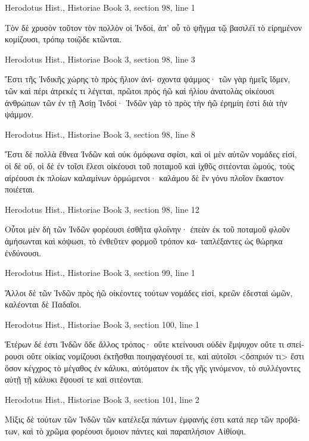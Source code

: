 \documentclass[12pt,letterpaper,twoside,final]{memoir}
\begin{document}
\begin{greek}
Herodotus Hist., Historiae 
Book 3, section 98, line 1

Τὸν δὲ χρυσὸν τοῦτον τὸν πολλὸν οἱ Ἰνδοί, ἀπ' οὗ τὸ 
ψῆγμα τῷ βασιλέϊ τὸ εἰρημένον κομίζουσι, τρόπῳ τοιῷδε 
κτῶνται. 



Herodotus Hist., Historiae 
Book 3, section 98, line 3

          Ἔστι τῆς Ἰνδικῆς χώρης τὸ πρὸς ἥλιον ἀνί-
σχοντα ψάμμος· τῶν γὰρ ἡμεῖς ἴδμεν, τῶν καὶ πέρι ἀτρεκές 
τι λέγεται, πρῶτοι πρὸς ἠῶ καὶ ἡλίου ἀνατολὰς οἰκέουσι 
ἀνθρώπων τῶν ἐν τῇ Ἀσίῃ Ἰνδοί· Ἰνδῶν γὰρ τὸ πρὸς τὴν 
ἠῶ ἐρημίη ἐστὶ διὰ τὴν ψάμμον. 



Herodotus Hist., Historiae 
Book 3, section 98, line 8

Ἔστι δὲ πολλὰ ἔθνεα Ἰνδῶν καὶ οὐκ ὁμόφωνα σφίσι, καὶ 
οἱ μὲν αὐτῶν νομάδες εἰσί, οἱ δὲ οὔ, οἱ δὲ ἐν τοῖσι ἕλεσι 
οἰκέουσι τοῦ ποταμοῦ καὶ ἰχθῦς σιτέονται ὠμούς, τοὺς 
αἱρέουσι ἐκ πλοίων καλαμίνων ὁρμώμενοι· καλάμου δὲ ἓν 
γόνυ πλοῖον ἕκαστον ποιέεται. 



Herodotus Hist., Historiae 
Book 3, section 98, line 12

                                   Οὗτοι μὲν δὴ τῶν Ἰνδῶν 
φορέουσι ἐσθῆτα φλοΐνην· ἐπεὰν ἐκ τοῦ ποταμοῦ φλοῦν   
ἀμήσωνται καὶ κόψωσι, τὸ ἐνθεῦτεν φορμοῦ τρόπον κα-
ταπλέξαντες ὡς θώρηκα ἐνδύνουσι. 



Herodotus Hist., Historiae 
Book 3, section 99, line 1

                                      Ἄλλοι δὲ τῶν Ἰνδῶν 
πρὸς ἠῶ οἰκέοντες τούτων νομάδες εἰσί, κρεῶν ἐδεσταὶ 
ὠμῶν, καλέονται δὲ Παδαῖοι. 



Herodotus Hist., Historiae 
Book 3, section 100, line 1

                                     Ἑτέρων δέ ἐστι Ἰνδῶν 
ὅδε ἄλλος τρόπος· οὔτε κτείνουσι οὐδὲν ἔμψυχον οὔτε τι 
σπείρουσι οὔτε οἰκίας νομίζουσι ἐκτῆσθαι ποιηφαγέουσί τε, 
καὶ αὐτοῖσι <ὄσπριόν τι> ἔστι ὅσον κέγχρος τὸ μέγαθος ἐν 
κάλυκι, αὐτόματον ἐκ τῆς γῆς γινόμενον, τὸ συλλέγοντες 
αὐτῇ τῇ κάλυκι ἕψουσί τε καὶ σιτέονται. 



Herodotus Hist., Historiae 
Book 3, section 101, line 2

                                                     Μίξις δὲ 
τούτων τῶν Ἰνδῶν τῶν κατέλεξα πάντων ἐμφανής ἐστι   
κατά περ τῶν προβάτων, καὶ τὸ χρῶμα φορέουσι ὅμοιον 
πάντες καὶ παραπλήσιον Αἰθίοψι. 




\end{greek}
\end{document}
